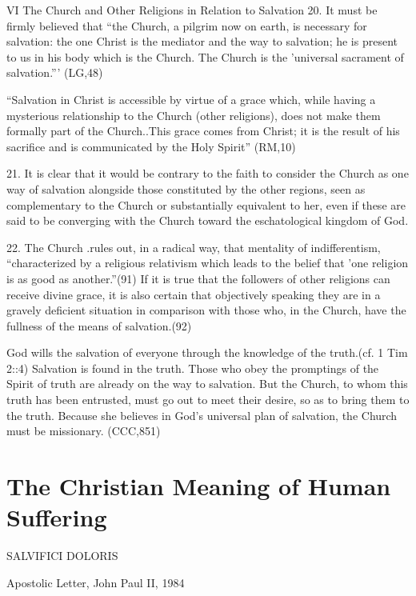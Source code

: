\documentclass[oneside]{book}
\begin{document}
VI The Church and Other Religions in Relation to Salvation
20. It must be firmly believed that ``the Church, a pilgrim now on earth, is
necessary for salvation: the one Christ is the mediator and the way to
salvation; he is present to us in his body which is the Church. The Church is
the 'universal sacrament of salvation.''' (LG,48)

``Salvation in Christ is accessible by virtue of a grace which, while having a
mysterious relationship to the Church (other religions), does not make them
formally part of the Church..This grace comes from Christ; it is the result of
his sacrifice and is communicated by the Holy Spirit'' (RM,10)

21. It is clear that it would be contrary to the faith to consider the Church as
one way of salvation alongside those constituted by the other regions, seen as
complementary to the Church or substantially equivalent to her, even if these
are said to be converging with the Church toward the eschatological kingdom of
God.

22. The Church .rules out, in a radical way, that mentality of indifferentism,
``characterized by a religious relativism which leads to the belief that 'one
religion is as good as another.''(91) If it is true that the followers of other
religions can receive divine grace, it is also certain that objectively speaking
they are in a gravely deficient situation in comparison with those who, in the
Church, have the fullness of the means of salvation.(92)

God wills the salvation of everyone through the knowledge of the truth.(cf. 1
Tim 2::4) Salvation is found in the truth. Those who obey the promptings of the
Spirit of truth are already on the way to salvation. But the Church, to whom
this truth has been entrusted, must go out to meet their desire, so as to bring
them to the truth. Because she believes in God's universal plan of salvation,
the Church must be missionary. (CCC,851)


\chapter{The Christian Meaning of Human Suffering}

SALVIFICI DOLORIS

Apostolic Letter, John Paul II, 1984
\end{document}

